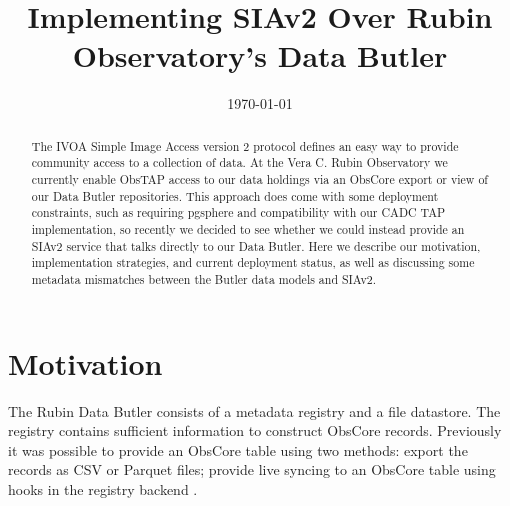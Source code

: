 \documentclass[11pt,twoside]{article}
\begin{document}

\date{\today}
\title{Implementing SIAv2 Over Rubin Observatory's Data Butler}



\begin{abstract}
The IVOA Simple Image Access version 2 protocol defines an easy way to provide community access to a collection of data. At the Vera C. Rubin Observatory we currently enable ObsTAP access to our data holdings via an ObsCore export or view of our Data Butler repositories. This approach does come with some deployment constraints, such as requiring pgsphere and compatibility with our CADC TAP implementation, so recently we decided to see whether we could instead provide an SIAv2 service that talks directly to our Data Butler. Here we describe our motivation, implementation strategies, and current deployment status, as well as discussing some metadata mismatches between the Butler data models and SIAv2.
\end{abstract}



\section{Motivation}

The Rubin Data Butler \citep{2022SPIE12189E..11J} consists of a metadata registry and a file datastore.
The registry contains sufficient information to construct ObsCore records.
Previously it was possible to provide an ObsCore table using two methods: export the records as CSV or Parquet files; provide live syncing to an ObsCore table using hooks in the registry backend \citep{DMTN-236}.
\end{document}

